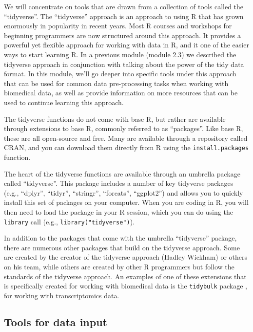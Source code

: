 \documentclass[]{tufte-book}
\begin{document}
We will concentrate on tools that are drawn from a collection of tools called the
``tidyverse''. The ``tidyverse'' approach is an approach to using R that has grown
enormously in popularity in recent years. Most R courses and workshops for
beginning programmers are now structured around this approach. It provides a
powerful yet flexible approach for working with data in R, and it one of the
easier ways to start learning R. In a previous module (module 2.3) we described
the tidyverse approach in conjunction with talking about the power of the tidy
data format. In this module, we'll go deeper into specific tools under this
approach that can be used for common data pre-processing tasks when working with
biomedical data, as well as provide information on more resources that can be
used to continue learning this approach.

The tidyverse functions do not come with base R, but rather are available
through extensions to base R, commonly referred to as ``packages''. Like base
R, these are all open-source and free. Many are available through a
repository called CRAN, and you can download them directly from R using the
\texttt{install.packages} function.

The heart of the tidyverse functions are available through an umbrella
package called ``tidyverse''. This package includes a number of key tidyverse
packages (e.g., ``dplyr'', ``tidyr'', ``stringr'', ``forcats'', ``ggplot2'') and allows you
to quickly install this set of packages on your computer. When you are coding
in R, you will then need to load the package in your R session, which you can
do using the \texttt{library} call (e.g., \texttt{library("tidyverse")}).

In addition to the packages that come with the umbrella ``tidyverse'' package,
there are numerous other packages that build on the tidyverse approach.
Some are created by the creator of the tidyverse approach (Hadley Wickham)
or others on his team, while others are created by other R programmers but
follow the standards of the tidyverse approach. An examples of one of
these extensions that is specifically created for working with biomedical data
is the \texttt{tidybulk} package \citep{mangiola2021tidybulk}, for working with
transcriptomics data.

\subsection{Tools for data input}\label{tools-for-data-input}
\end{document}
